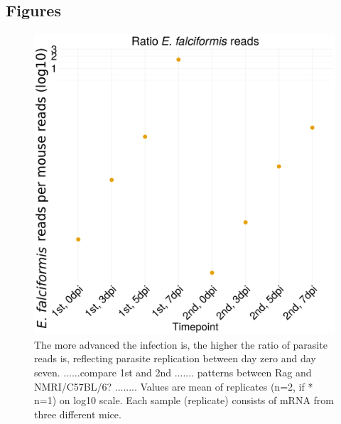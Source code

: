 \documentclass{bmcart}
\begin{document}
\begin{backmatter}


\section*{Figures}
\begin{figure}[h!]
  \includegraphics[width=0.5\linewidth]{efmm-ratio}
  \caption{
  The more advanced the infection is, the higher the ratio of parasite reads is, reflecting parasite replication between day zero and day seven. ......compare 1st and 2nd ....... patterns between Rag and NMRI/C57BL/6?  ........ Values are mean of replicates (n=2, if * n=1) on log10 scale. Each sample (replicate) consists of mRNA from three different mice.}
  \end{figure}


\end{backmatter}
\end{document}
